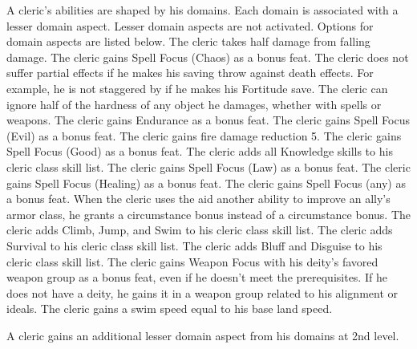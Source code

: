  A cleric's abilities are shaped by his domains. Each domain is associated with a lesser domain aspect. Lesser domain aspects are not activated. Options for domain aspects are listed below.
 The cleric takes half damage from falling damage.
 The cleric gains Spell Focus (Chaos) as a bonus feat.
 The cleric does not suffer partial effects if he makes his saving throw against death effects. For example, he is not staggered by  if he makes his Fortitude save.
 The cleric can ignore half of the hardness of any object he damages, whether with spells or weapons.
 The cleric gains Endurance as a bonus feat.
 The cleric gains Spell Focus (Evil) as a bonus feat.
 The cleric gains fire damage reduction 5.
 The cleric gains Spell Focus (Good) as a bonus feat.
 The cleric adds all Knowledge skills to his cleric class skill list.
 The cleric gains Spell Focus (Law) as a bonus feat.
 The cleric gains Spell Focus (Healing) as a bonus feat.
 The cleric gains Spell Focus (any) as a bonus feat.
 When the cleric uses the aid another ability to improve an ally's armor class, he grants a  circumstance bonus instead of a  circumstance bonus.
 The cleric adds Climb, Jump, and Swim to his cleric class skill list.
 The cleric adds Survival to his cleric class skill list.
 The cleric adds Bluff and Disguise to his cleric class skill list.
 The cleric gains Weapon Focus with his deity's favored weapon group as a bonus feat, even if he doesn't meet the prerequisites. If he does not have a deity, he gains it in a weapon group related to his alignment or ideals.
 The cleric gains a swim speed equal to his base land speed.

A cleric gains an additional lesser domain aspect from his domains at 2nd level.

